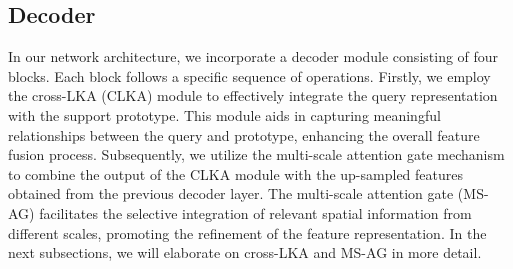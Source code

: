 \documentclass[runningheads]{llncs}
\begin{document}
\subsection{Decoder}
In our network architecture, we incorporate a decoder module consisting of four blocks. Each block follows a specific sequence of operations. Firstly, we employ the cross-LKA (CLKA) module to effectively integrate the query representation with the support prototype. This module aids in capturing meaningful relationships between the query and prototype, enhancing the overall feature fusion process. Subsequently, we utilize the multi-scale attention gate mechanism to combine the output of the CLKA module with the up-sampled features obtained from the previous decoder layer. The multi-scale attention gate (MS-AG) facilitates the selective integration of relevant spatial information from different scales, promoting the refinement of the feature representation. In the next subsections, we will elaborate on cross-LKA and MS-AG in more detail.
\end{document}
